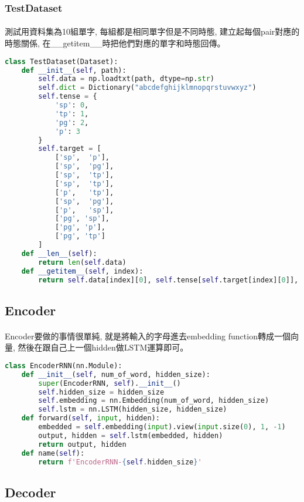 \subsubsection{TestDataset}
\paragraph{}
測試用資料集為10組單字, 每組都是相同單字但是不同時態, 建立起每個pair對應的時態關係, 在\_\_getitem\_\_時把他們對應的單字和時態回傳。
\begin{lstlisting}[language=Python]
class TestDataset(Dataset):
    def __init__(self, path):
        self.data = np.loadtxt(path, dtype=np.str)
        self.dict = Dictionary("abcdefghijklmnopqrstuvwxyz")
        self.tense = {
            'sp': 0,
            'tp': 1,
            'pg': 2,
            'p': 3
        }
        self.target = [
            ['sp',  'p'],
            ['sp',  'pg'],
            ['sp',  'tp'],
            ['sp',  'tp'],
            ['p',   'tp'],
            ['sp',  'pg'],
            ['p',   'sp'],
            ['pg', 'sp'],
            ['pg', 'p'],
            ['pg', 'tp']
        ]
    def __len__(self):
        return len(self.data)
    def __getitem__(self, index):
        return self.data[index][0], self.tense[self.target[index][0]], self.data[index][1], self.tense[self.target[index][1]]
\end{lstlisting}
\subsection{Encoder}
\paragraph{}
Encoder要做的事情很單純, 就是將輸入的字母進去embedding function轉成一個向量, 然後在跟自己上一個hidden做LSTM運算即可。
\begin{lstlisting}[language=Python]
class EncoderRNN(nn.Module):
    def __init__(self, num_of_word, hidden_size):
        super(EncoderRNN, self).__init__()
        self.hidden_size = hidden_size
        self.embedding = nn.Embedding(num_of_word, hidden_size)
        self.lstm = nn.LSTM(hidden_size, hidden_size)
    def forward(self, input, hidden):
        embedded = self.embedding(input).view(input.size(0), 1, -1)
        output, hidden = self.lstm(embedded, hidden)
        return output, hidden
    def name(self):
        return f'EncoderRNN-{self.hidden_size}'
\end{lstlisting}
\subsection{Decoder}
